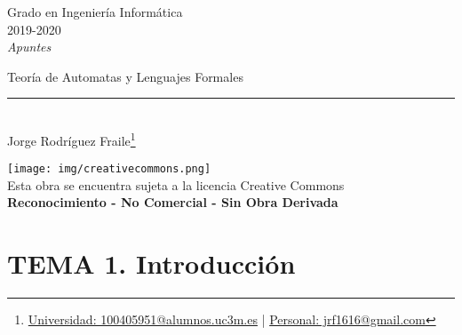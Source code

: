 \documentclass[12pt, twoside, openright]{report} %
\begin{document}

\begin{titlepage}
	\begin{sffamily}
		\color{azulUC3M}
		\begin{center}
			\begin{figure}[H] %
			\end{figure}
			\vspace{2.5cm}
			\begin{Large}
				Grado en Ingeniería Informática\\
				2019-2020\\
				\vspace{2cm}
				\textsl{Apuntes}\\
				\bigskip
			\end{Large}
			{\Huge Teoría de Automatas y Lenguajes Formales}\\
			\vspace*{0.5cm}
			\rule{10.5cm}{0.1mm}\\
			\vspace*{0.9cm}
			{\LARGE Jorge Rodríguez Fraile\footnote{\href{mailto:100405951@alumnos.uc3m.es}{Universidad: 100405951@alumnos.uc3m.es}  |  \href{mailto:jrf1616@gmail.com}{Personal: jrf1616@gmail.com}}}\\
			\vspace*{1cm}
		\end{center}
		\vfill
		\color{black}
		\texttt{[image: img/creativecommons.png]}\\
		Esta obra se encuentra sujeta a la licencia Creative Commons\\ \textbf{Reconocimiento - No Comercial - Sin Obra Derivada}
	\end{sffamily}
\end{titlepage}


\tableofcontents
\thispagestyle{fancy}






\part{TEMA 1. Introducción}

\end{document}
